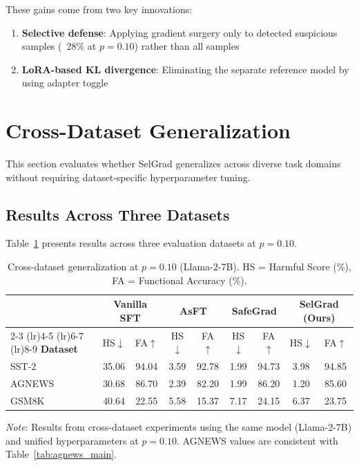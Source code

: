 These gains come from two key innovations:
\begin{enumerate}
    \item \textbf{Selective defense}: Applying gradient surgery only to detected suspicious samples (~28\% at $p=0.10$) rather than all samples
    \item \textbf{LoRA-based KL divergence}: Eliminating the separate reference model by using adapter toggle
\end{enumerate}

\section{Cross-Dataset Generalization}
\label{sec:cross_dataset}

This section evaluates whether SelGrad generalizes across diverse task domains without requiring dataset-specific hyperparameter tuning.

\subsection{Results Across Three Datasets}
\label{subsec:three_datasets}

Table~\ref{tab:cross_dataset} presents results across three evaluation datasets at $p=0.10$.

\begin{table}[htbp]
\centering
\caption{Cross-dataset generalization at $p=0.10$ (Llama-2-7B). HS = Harmful Score (\%), FA = Functional Accuracy (\%).}
\label{tab:cross_dataset}
\renewcommand{\arraystretch}{1.2}
\begin{tabular}{l cc cc cc cc}
\toprule
& \multicolumn{2}{c}{\textbf{Vanilla SFT}} & \multicolumn{2}{c}{\textbf{AsFT}} & \multicolumn{2}{c}{\textbf{SafeGrad}} & \multicolumn{2}{c}{\textbf{SelGrad (Ours)}} \\
\cmidrule(lr){2-3} \cmidrule(lr){4-5} \cmidrule(lr){6-7} \cmidrule(lr){8-9}
\textbf{Dataset} & HS$\downarrow$ & FA$\uparrow$ & HS$\downarrow$ & FA$\uparrow$ & HS$\downarrow$ & FA$\uparrow$ & HS$\downarrow$ & FA$\uparrow$ \\
\midrule
SST-2 & 35.06 & 94.04 & 3.59 & 92.78 & \cellcolor{bestcolor}1.99 & 94.73 & 3.98 & \cellcolor{bestcolor}94.85 \\
AGNEWS & 30.68 & \cellcolor{bestcolor}86.70 & 2.39 & 82.20 & 1.99 & 86.20 & \cellcolor{bestcolor}1.20 & 85.60 \\
GSM8K & 40.64 & 22.55 & \cellcolor{bestcolor}5.58 & 15.37 & 7.17 & \cellcolor{bestcolor}24.15 & 6.37 & 23.75 \\
\bottomrule
\end{tabular}

\vspace{0.3em}
\noindent\textit{Note}: Results from cross-dataset experiments using the same model (Llama-2-7B) and unified hyperparameters at $p=0.10$. AGNEWS values are consistent with Table~\ref{tab:agnews_main}.
\end{table}

